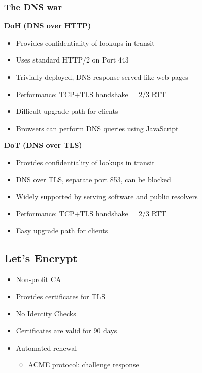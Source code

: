 \subsubsection{The DNS war}
\textbf{DoH (DNS over HTTP)}
\begin{itemize}
    \item Provides confidentiality of lookups in transit
    \item Uses standard HTTP/2 on Port 443
    \item Trivially deployed, DNS response served like web pages
    \item Performance: TCP+TLS handshake = 2/3 RTT
    \item Difficult upgrade path for clients
    \item Browsers can perform DNS queries using JavaScript
\end{itemize}
\textbf{DoT (DNS over TLS)}
\begin{itemize}
    \item Provides confidentiality of lookups in transit
    \item DNS over TLS, separate port 853, can be blocked
    \item Widely supported by serving software and public resolvers
    \item Performance: TCP+TLS handshake = 2/3 RTT
    \item Easy upgrade path for clients
\end{itemize}

\subsection{Let's Encrypt}
\begin{itemize}
    \item Non-profit CA
    \item Provides certificates for TLS
    \item No Identity Checks
    \item Certificates are valid for 90 days
    \item Automated renewal
    \begin{itemize}
        \item ACME protocol: challenge response
    \end{itemize}
\end{itemize}